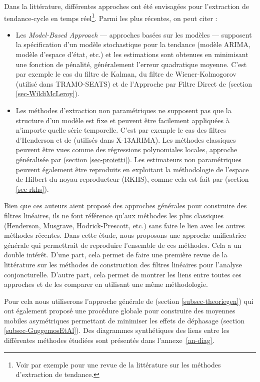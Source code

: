 \documentclass[
  12pt,
  a4paper,french]{article}
\newcommand\1{\mathds{1}}
\begin{document}
Dans la littérature, différentes approches ont été envisagées pour l'extraction de tendance-cycle en temps réel\footnote{Voir par exemple \textcite{alexandrov2012TEreview} pour une revue de la littérature sur les méthodes d'extraction de tendance.}.
Parmi les plus récentes, on peut citer :

\begin{itemize}
\item
  Les \emph{Model-Based Approach} --- approches basées sur les modèles --- supposent la spécification d'un modèle stochastique pour la tendance (modèle ARIMA, modèle d'espace d'état, etc.) et les estimations sont obtenues en minimisant une fonction de pénalité, généralement l'erreur quadratique moyenne.
  C'est par exemple le cas du filtre de Kalman, du filtre de Wiener-Kolmogorov (utilisé dans TRAMO-SEATS) et de l'Approche par Filtre Direct de \textcite{trilemmaWMR2019} (section \ref{sec-WildiMcLeroy}).
\item
  Les méthodes d'extraction non paramétriques ne supposent pas que la structure d'un modèle est fixe et peuvent être facilement appliquées à n'importe quelle série temporelle.
  C'est par exemple le cas des filtres d'Henderson et de \textcite{musgrave1964set} (utilisés dans X-13ARIMA).
  Les méthodes classiques peuvent être vues comme des régressions polynomiales locales, approche généralisée par \textcite{proietti2008} (section \ref{sec-proietti}).
  Les estimateurs non paramétriques peuvent également être reproduits en exploitant la méthodologie de l'espace de Hilbert du noyau reproducteur (RKHS), comme cela est fait par
  \textcite{dagumbianconcini2008} (section \ref{sec-rkhs}).
\end{itemize}

Bien que ces auteurs aient proposé des approches générales pour construire des filtres linéaires, ils ne font référence qu'aux méthodes les plus classiques (Henderson, Musgrave, Hodrick-Prescott, etc.) sans faire le lien avec les autres méthodes récentes.
Dans cette étude, nous proposons une approche unificatrice générale qui permettrait de reproduire l'ensemble de ces méthodes.
Cela a un double intérêt.
D'une part, cela permet de faire une première revue de la littérature sur les méthodes de construction des filtres linéaires pour l'analyse conjoncturelle.
D'autre part, cela permet de montrer les liens entre toutes ces approches et de les comparer en utilisant une même méthodologie.

Pour cela nous utiliserons l'approche générale de \textcite{ch15HBSA} (section \ref{subsec-theoriegen}) qui ont également proposé une procédure globale pour construire des moyennes mobiles asymétriques permettant de minimiser les effets de déphasage (section \ref{subsec-GuggemosEtAl}).
Des diagrammes synthétiques des liens entre les différentes méthodes étudiées sont présentés dans l'annexe~\ref{an-diag}.
\end{document}
